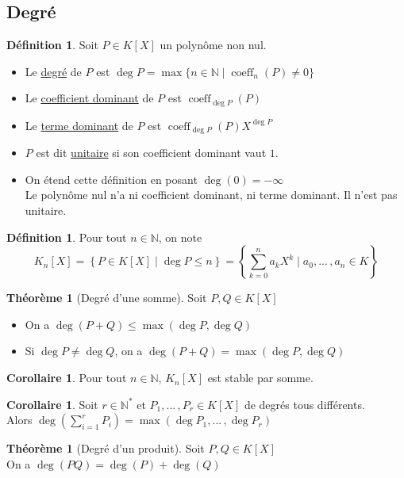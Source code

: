 \documentclass[10pt,a4paper]{article}
\theoremstyle{definition}
\newtheorem{theorem}[proposition]{Théorème}
\newtheorem{corollaire}[proposition]{Corollaire}
\newtheorem{definition}[proposition]{Définition}
\DeclareMathOperator{\coeff}{coeff}
\begin{document}
\subsection{Degré}
\begin{definition}
Soit $P \in K[X]$ un polynôme non nul.
\begin{itemize}
\item Le \uline{degré} de $P$ est $\deg P = \max\{ n \in \mathbb{N} \mid \coeff_n(P) \neq 0\}$
\item Le \uline{coefficient dominant} de $P$ est $\coeff_{\deg P}(P)$
\item Le \uline{terme dominant} de $P$ est $\coeff_{\deg P}(P) X^{\deg P}$
\item $P$ est dit \uline{unitaire} si son coefficient dominant vaut $1$.
\item On étend cette définition en posant $\deg(0) = -\infty$ \\
Le polynôme nul n'a ni coefficient dominant, ni terme dominant. Il n'est pas unitaire.
\end{itemize}
\end{definition}
\begin{definition}
Pour tout $n \in \mathbb{N}$, on note
\[ K_n[X] = \left\{ P \in K[X] \mid \deg P \leq n \right\} = \left\{ \sum_{k = 0}^n a_k X^k \mid a_0, ...\,, a_n \in K \right\} \]
\end{definition}
\begin{theorem}[Degré d'une somme]
Soit $P, Q \in K[X]$
\begin{itemize}
\item On a $\deg(P + Q) \leq \max(\deg P, \deg Q)$
\item Si $\deg P \neq \deg Q$, on a $\deg(P + Q) = \max(\deg P, \deg Q)$
\end{itemize}
\end{theorem}
\begin{corollaire}
Pour tout $n \in \mathbb{N}$, $K_n[X]$ est stable par somme.
\end{corollaire}
\begin{corollaire}
Soit $r \in \mathbb{N}^*$ et $P_1, ...\,, P_r \in K[X]$ de degrés tous différents. \\
Alors $\deg(\sum\limits_{i = 1}^r P_i) = \max(\deg P_1, ...\,, \deg P_r)$
\end{corollaire}
\begin{theorem}[Degré d'un produit]
Soit $P, Q \in K[X]$ \\
On a $\deg(PQ) = \deg(P) + \deg(Q)$
\end{theorem}
\end{document}
